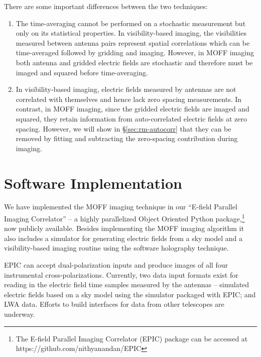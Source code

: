 \documentclass[a4paper,fleqn,usenatbib]{mnras}
\begin{document}
There are some important differences between the two techniques:
\begin{enumerate}
\item The time-averaging cannot be performed on a stochastic measurement but only on its statistical properties. In visibility-based imaging, the visibilities measured between antenna pairs represent spatial correlations which can be time-averaged followed by gridding and imaging. However, in MOFF imaging both antenna and gridded electric fields are stochastic and therefore must be imaged and squared before time-averaging. 
\item In visibility-based imaging, electric fields measured by antennas are not correlated with themselves and hence lack zero spacing measurements. In contrast, in MOFF imaging, since the gridded electric fields are imaged and squared, they retain information from auto-correlated electric fields at zero spacing. However, we will show in \S\ref{sec:rm-autocorr} that they can be removed by fitting and subtracting the zero-spacing contribution during imaging.
\end{enumerate} 

\section{Software Implementation}\label{sec:software}

We have implemented the MOFF imaging technique in our ``E-field Parallel Imaging Correlator'' -- a highly parallelized Object Oriented Python package,\footnote{The E-field Parallel Imaging Correlator (EPIC) package can be accessed at https://github.com/nithyanandan/EPIC} now publicly available. Besides implementing the MOFF imaging algorithm it also includes a simulator for generating electric fields from a sky model and a visibility-based imaging routine using the software holography technique.

EPIC can accept dual-polarization inputs and produce images of all four instrumental cross-polarizations. Currently, two data input formats exist for reading in the electric field time samples measured by the antennas -- simulated electric fields based on a sky model using the simulator packaged with EPIC; and LWA data. Efforts to build interfaces for data from other telescopes are underway.
\end{document}
